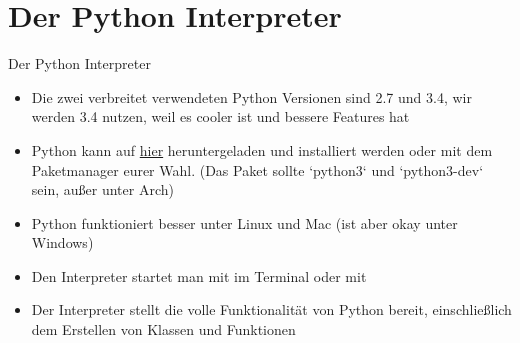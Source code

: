 \section{Der Python Interpreter}
\begin{frame}{Der Python Interpreter}
	\begin{itemize}
    	\item Die zwei verbreitet verwendeten Python Versionen sind 2.7 und 3.4, wir werden 3.4 nutzen, weil es cooler ist und bessere Features hat
    	\item Python kann auf \href{http://www.python.org}{hier} heruntergeladen und installiert werden oder mit dem Paketmanager eurer Wahl. (Das Paket sollte `python3` und `python3-dev` sein, au\ss{}er unter Arch)
    	\item Python funktioniert besser unter Linux und Mac (ist aber okay unter Windows)
    	\item Den Interpreter startet man mit  im Terminal oder mit 
    	\item Der Interpreter stellt die volle Funktionalität von Python bereit, einschlie\ss{}lich dem Erstellen von Klassen und Funktionen
	\end{itemize}
\end{frame}

